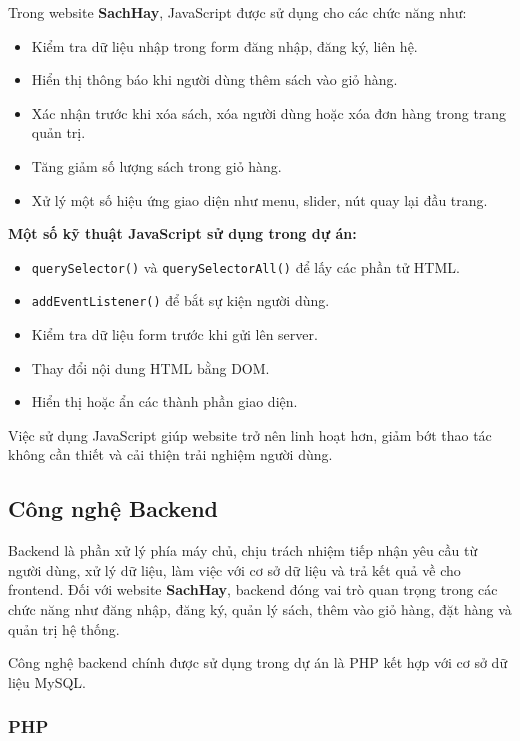 Trong website \textbf{SachHay}, JavaScript được sử dụng cho các chức năng như:

\begin{itemize}
	\item Kiểm tra dữ liệu nhập trong form đăng nhập, đăng ký, liên hệ.
	\item Hiển thị thông báo khi người dùng thêm sách vào giỏ hàng.
	\item Xác nhận trước khi xóa sách, xóa người dùng hoặc xóa đơn hàng trong trang quản trị.
	\item Tăng giảm số lượng sách trong giỏ hàng.
	\item Xử lý một số hiệu ứng giao diện như menu, slider, nút quay lại đầu trang.
\end{itemize}

\textbf{Một số kỹ thuật JavaScript sử dụng trong dự án:}

\begin{itemize}
	\item \texttt{querySelector()} và \texttt{querySelectorAll()} để lấy các phần tử HTML.
	\item \texttt{addEventListener()} để bắt sự kiện người dùng.
	\item Kiểm tra dữ liệu form trước khi gửi lên server.
	\item Thay đổi nội dung HTML bằng DOM.
	\item Hiển thị hoặc ẩn các thành phần giao diện.
\end{itemize}

Việc sử dụng JavaScript giúp website trở nên linh hoạt hơn, giảm bớt thao tác không cần thiết và cải thiện trải nghiệm người dùng.

\subsection{Công nghệ Backend}

Backend là phần xử lý phía máy chủ, chịu trách nhiệm tiếp nhận yêu cầu từ người dùng, xử lý dữ liệu, làm việc với cơ sở dữ liệu và trả kết quả về cho frontend. Đối với website \textbf{SachHay}, backend đóng vai trò quan trọng trong các chức năng như đăng nhập, đăng ký, quản lý sách, thêm vào giỏ hàng, đặt hàng và quản trị hệ thống.

Công nghệ backend chính được sử dụng trong dự án là PHP kết hợp với cơ sở dữ liệu MySQL.

\subsubsection{PHP}

